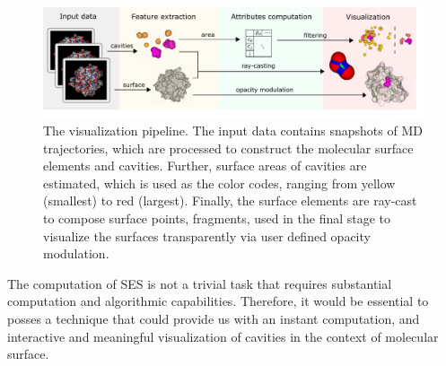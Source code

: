 \begin{figure}[tb]
  \centering
  \includegraphics[width=\textwidth]{image/overview.pdf}
  \caption{The visualization pipeline. The input data contains snapshots of MD trajectories, which are processed to construct the molecular surface elements and cavities. Further, surface areas of cavities are estimated, which is used as the color codes, ranging from yellow (smallest) to red (largest). Finally, the surface elements are ray-cast to compose surface points, fragments, used in the final stage to visualize the surfaces transparently via user defined opacity modulation.}
	\label{fig:overview}
\end{figure}

The computation of SES is not a trivial task that requires substantial computation and algorithmic capabilities. 
Therefore, it would be essential to posses a technique that could provide us with an instant computation, and interactive and meaningful visualization of cavities in the context of molecular surface.

